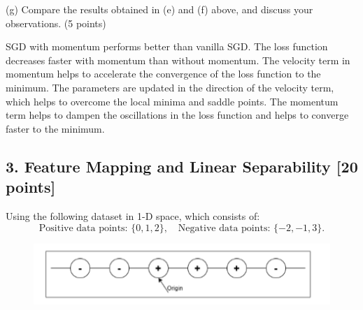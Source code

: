 \documentclass[a3paper,12pt]{article} %
\begin{document}
(g)
Compare the results obtained in (e) and (f) above, and discuss your observations.
\hfill (5 points)


SGD with momentum performs better than vanilla SGD. The loss function decreases faster with momentum than without momentum. The velocity term in momentum helps to accelerate the convergence of the loss function to the minimum. The parameters are updated in the direction of the velocity term, which helps to overcome the local minima and saddle points. The momentum term helps to dampen the oscillations in the loss function and helps to converge faster to the minimum. 


\vspace{30pt}
\subsection*{3. Feature Mapping and Linear Separability [20 points]}

Using the following dataset in 1-D space, which consists of:
\[
\text{Positive data points: } \{0, 1, 2\}, \quad \text{Negative data points: } \{-2, -1, 3\}.
\]

\begin{figure}[h!]
    \centering
    \includegraphics[width=0.5\linewidth]{drawio.png}
    \label{fig:enter-label}
\end{figure}
\end{document}
